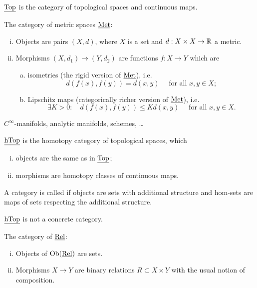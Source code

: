\begin{examples*}
	\item \( \underline{\mathrm{Top}} \) is the category of topological spaces and continuous maps.
	\item The category of metric spaces \( \underline{\mathrm{Met}} \):
		\begin{enumerate}[(i)]
			\item Objects are pairs \( (X, d) \), where \( X \) is a set and \( d: X \times X \to \mathbb{R} \) a metric.
			\item Morphisms \( (X, d_1) \to (Y, d_2) \) are functions \( f: X \to Y \) which are
				\begin{enumerate}[a)]
					\item isometries (the rigid version of \( \underline{\mathrm{Met}} \)), i.e.
						\[
							d(f(x), f(y)) = d(x, y) \quad \text{ for all } x, y \in X;
						\]
					\item Lipschitz maps (categorically richer version of \( \underline{\mathrm{Met}} \)), i.e.
						\[
							\exists K > 0: \quad d(f(x), f(y)) \le K d(x, y) \quad \text{ for all } x, y \in X.
						\]
				\end{enumerate}
		\end{enumerate}

	\item \( C^{\infty} \)-manifolds, analytic manifolds, schemes, \dots
	\item \( \underline{\mathrm{hTop}} \) is the homotopy category of topological spaces, which
		\begin{enumerate}[(i)]
			\item objects are the same as in \( \underline{\mathrm{{Top}}} \);
			\item morphisms are homotopy classes of continuous maps.
		\end{enumerate}

		\begin{definition*}[intuitive]
			A category is called  if objects are sets with additional structure and hom-sets are maps of sets respecting the additional structure.
		\end{definition*}

		\begin{theorem*}[w/o proof]
			\( \underline{\mathrm{hTop}} \) is not a concrete category.
		\end{theorem*}

	\item The category of  \( \underline{\mathrm{Rel}} \):
		\begin{enumerate}[(i)]
			\item Objects of \( \operatorname{Ob}(\underline{\mathrm{Rel}}) \) are sets.
			\item Morphisms \( X \to Y \) are binary relations \( R \subset X \times Y \) with the usual notion of composition.
		\end{enumerate}


\end{examples*}
